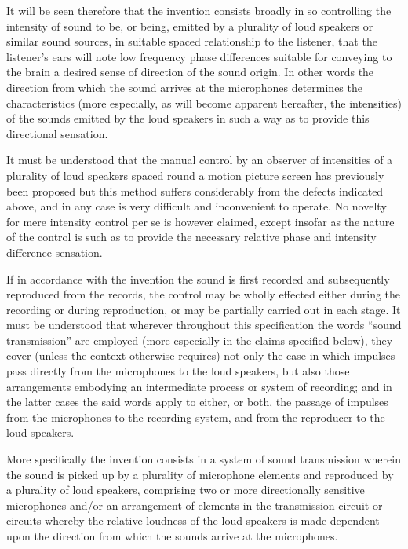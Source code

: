 \documentclass[11pt]{article}
\begin{document}
\begin{multicols*}{2}
It will be seen therefore that the invention consists broadly in so controlling the intensity of sound to be, or being, emitted by a plurality of loud speakers or similar sound sources, in suitable spaced relationship to the listener, that the listener’s ears will note low frequency phase differences suitable for conveying to the brain a desired sense of direction of the sound origin. In other words the direction from which the sound arrives at the microphones determines the characteristics (more especially, as will become apparent hereafter, the intensities) of the sounds emitted by the loud speakers in such a way as to provide this directional sensation.

It must be understood that the manual control by an observer of intensities of a plurality of loud speakers spaced round a motion picture screen has previously been proposed but this method suffers considerably from the defects indicated above, and in any case is very difficult and inconvenient to operate. No novelty for mere intensity control per se is however claimed, except insofar as the nature of the control is such as to provide the necessary relative phase and intensity difference sensation.

If in accordance with the invention the sound is first recorded and subsequently reproduced from the records, the control may be wholly effected either during the recording or during reproduction, or may be partially carried out in each stage. It must be understood that wherever throughout this specification the words “sound transmission” are employed (more especially in the claims specified below), they cover (unless the context otherwise requires) not only the case in which impulses pass directly from the microphones to the loud speakers, but also those arrangements embodying an intermediate process or system of recording; and in the latter cases the said words apply to either, or both, the passage of impulses from the microphones to the recording system, and from the reproducer to the loud speakers.

More specifically the invention consists in a system of sound transmission wherein the sound is picked up by a plurality of microphone elements and reproduced by a plurality of loud speakers, comprising two or more directionally sensitive microphones and/or an arrangement of elements in the transmission circuit or circuits whereby the relative loudness of the loud speakers is made dependent upon the direction from which the sounds arrive at the microphones.


\end{multicols*}
\end{document}
